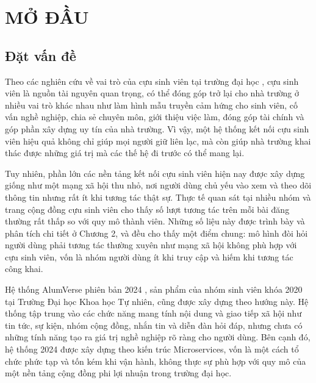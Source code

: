\documentclass[12pt,a4paper,oneside]{report}
\begin{document}
\chapter{MỞ ĐẦU}

\section{Đặt vấn đề}

Theo các nghiên cứu về vai trò của cựu sinh viên tại trường đại học \cite{obeng,unisel}, cựu sinh viên là nguồn tài nguyên quan trọng, có thể đóng góp trở lại cho nhà trường ở nhiều vai trò khác nhau như làm hình mẫu truyền cảm hứng cho sinh viên, cố vấn nghề nghiệp, chia sẻ chuyên môn, giới thiệu việc làm, đóng góp tài chính và góp phần xây dựng uy tín của nhà trường. Vì vậy, một hệ thống kết nối cựu sinh viên hiệu quả không chỉ giúp mọi người giữ liên lạc, mà còn giúp nhà trường khai thác được những giá trị mà các thế hệ đi trước có thể mang lại.

Tuy nhiên, phần lớn các nền tảng kết nối cựu sinh viên hiện nay được xây dựng giống như một mạng xã hội thu nhỏ, nơi người dùng chủ yếu vào xem và theo dõi thông tin nhưng rất ít khi tương tác thật sự. Thực tế quan sát tại nhiều nhóm và trang cộng đồng cựu sinh viên cho thấy số lượt tương tác trên mỗi bài đăng thường rất thấp so với quy mô thành viên. Những số liệu này được trình bày và phân tích chi tiết ở Chương 2, và đều cho thấy một điểm chung: mô hình đòi hỏi người dùng phải tương tác thường xuyên như mạng xã hội không phù hợp với cựu sinh viên, vốn là nhóm người dùng ít khi truy cập và hiếm khi tương tác công khai.

Hệ thống AlumVerse phiên bản 2024 \cite{alumverse}, sản phẩm của nhóm sinh viên khóa 2020 tại Trường Đại học Khoa học Tự nhiên, cũng được xây dựng theo hướng này. Hệ thống tập trung vào các chức năng mang tính nội dung và giao tiếp xã hội như tin tức, sự kiện, nhóm cộng đồng, nhắn tin và diễn đàn hỏi đáp, nhưng chưa có những tính năng tạo ra giá trị nghề nghiệp rõ ràng cho người dùng. Bên cạnh đó, hệ thống 2024 được xây dựng theo kiến trúc Microservices, vốn là một cách tổ chức phức tạp và tốn kém khi vận hành, không thực sự phù hợp với quy mô của một nền tảng cộng đồng phi lợi nhuận trong trường đại học.
\end{document}
